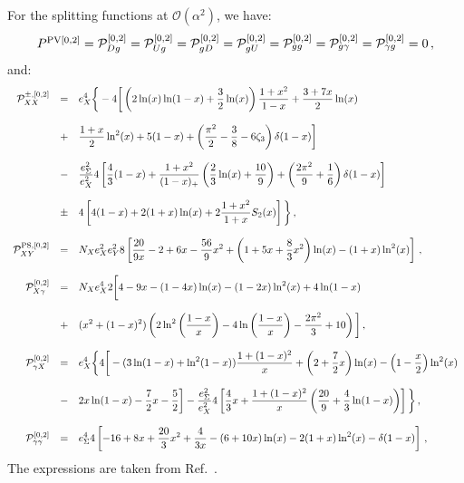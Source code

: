 \documentclass[10pt,a4paper]{article}
\begin{document}
For the splitting functions at $\mathcal{O}(\alpha^2)$, we have:
\begin{equation}
\begin{array}{l}
  P^{\rm PV [0,2]}=\mathcal{P}_{Dg}^{[0,2]}=\mathcal{P}_{Ug}^{[0,2]}=\mathcal{P}_{gD}^{[0,2]}=\mathcal{P}_{gU}^{[0,2]}=\mathcal{P}_{gg}^{[0,2]}=\mathcal{P}_{g\gamma}^{[0,2]}=\mathcal{P}_{\gamma g}^{[0,2]}=0\,,
\end{array}
\end{equation}
and:
\begin{equation}
\begin{array}{rcl}
  \displaystyle
  \mathcal{P}_{XX}^{\pm,[0,2]}&=&\displaystyle e_X^4\bigg\{-4\bigg[\left(2\ln(x)\ln(1-x)+\frac{3}{2}\ln(x)\right)\frac{1+x^2}{1-x}+\frac{3+7x}{2}\ln(x)\\
\\
&+&\displaystyle\frac{1+x}{2}\ln^2(x)+5(1-x)+\left(\frac{\pi^2}{2}-\frac{3}{8}-6\zeta_3\right)\delta(1-x)\bigg]\\
\\
&-&\displaystyle \frac{e_\Sigma^2}{e_X^2}4\left[\frac{4}{3}(1-x)+\frac{1+x^2}{(1-x)_+}\left(\frac{2}{3}\ln(x)+\frac{10}{9}\right)+\left(\frac{2\pi^2}{9}+\frac{1}{6}\right)\delta(1-x)\right]\\
\\
&\pm&\displaystyle 4\left[4(1-x)+2(1+x)\ln(x)+2\frac{1+x^2}{1+x}S_2(x)\right]\bigg\}\,,\\
\\
  \displaystyle \mathcal{P}^{\rm PS,[0,2]}_{XY}&=&\displaystyle N_Xe_X^2e_Y^28\left[\frac{20}{9x}-2+6x-\frac{56}{9}x^2+\left(1+5x+\frac{8}{3}x^2\right)\ln(x)-(1+x)\ln^2(x)\right]\,,\\
  \\
  \displaystyle \mathcal{P}_{X\gamma}^{[0,2]}&=&\displaystyle N_X e_X^4
  2\bigg[4-9x-(1-4x)\ln(x)-(1-2x)\ln^2(x)+4\ln(1-x)\\
\\
&+&\displaystyle (x^2+(1-x)^2)\left(2\ln^2\left(\frac{1-x}{x}\right)-4\ln\left(\frac{1-x}{x}\right)-\frac{2\pi^2}{3}+10 \right)\bigg]\,,\\
  \\
  \displaystyle \mathcal{P}_{\gamma X}^{[0,2]}&=&\displaystyle
                                                  e_X^4\bigg\{4\bigg[-(3\ln(1-x)+\ln^2(1-x))\frac{1+(1-x)^2}{x}+\left(2+\frac{7}{2}x\right)\ln(x)-\left(1-\frac{x}{2}\right)\ln^2(x)\\
\\
&-&\displaystyle 2x\ln(1-x)-\frac{7}{2}x-\frac{5}{2}\bigg]- \frac{e_\Sigma^2}{e_X^2}4\left[\frac{4}{3}x+\frac{1+(1-x)^2}{x}\left(\frac{20}{9}+\frac{4}{3}\ln(1-x)\right)\right]\bigg\}\,,\\
  \\
  \displaystyle \mathcal{P}_{\gamma\gamma}^{[0,2]}&=&\displaystyle e_\Sigma^44\left[-16+8x+\frac{20}{3}x^2+\frac{4}{3x}-(6+10x)\ln(x)-2(1+x)\ln^2(x)-\delta(1-x)\right]\,,
\end{array}
\end{equation}
The expressions are taken from Ref.~\cite{deFlorian:2016gvk}.
\end{document}
